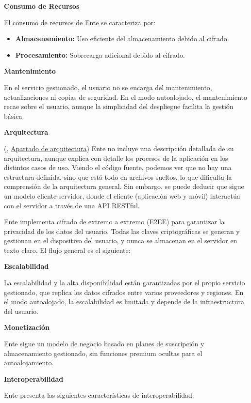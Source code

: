 \textbf{Consumo de Recursos}

El consumo de recursos de Ente se caracteriza por:

\begin{itemize}
    \item \textbf{Almacenamiento:} Uso eficiente del almacenamiento debido al cifrado.
    \item \textbf{Procesamiento:} Sobrecarga adicional debido al cifrado.
\end{itemize}

\textbf{Mantenimiento}

En el servicio gestionado, el usuario no se encarga del mantenimiento, actualizaciones ni copias de seguridad. En el modo autoalojado, el mantenimiento recae sobre el usuario, aunque la simplicidad del despliegue facilita la gestión básica.

\textbf{Arquitectura}

(\cite{ente-documentation}, \href{https://ente.io/architecture/}{Apartado de arquitectura}) Ente no incluye una descripción detallada de su arquitectura, aunque explica con detalle los procesos de la aplicación en los distintos casos de uso. Viendo el código fuente, podemos ver que no hay una estructura definida, sino que está todo en archivos sueltos, lo que dificulta la comprensión de la arquitectura general. Sin embargo, se puede deducir que sigue un modelo cliente-servidor, donde el cliente (aplicación web y móvil) interactúa con el servidor a través de una API RESTful.

Ente implementa cifrado de extremo a extremo (E2EE) para garantizar la privacidad de los datos del usuario. Todas las claves criptográficas se generan y gestionan en el dispositivo del usuario, y nunca se almacenan en el servidor en texto claro. El flujo general es el siguiente:

\textbf{Escalabilidad}

La escalabilidad y la alta disponibilidad están garantizadas por el propio servicio gestionado, que replica los datos cifrados entre varios proveedores y regiones. En el modo autoalojado, la escalabilidad es limitada y depende de la infraestructura del usuario.

\textbf{Monetización}

Ente sigue un modelo de negocio basado en planes de suscripción y almacenamiento gestionado, sin funciones premium ocultas para el autoalojamiento.

\textbf{Interoperabilidad}

Ente presenta las siguientes características de interoperabilidad:

